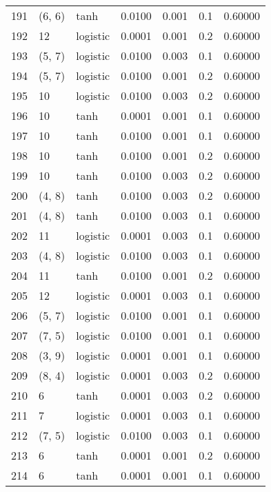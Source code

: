 \begin{tabular}{lllrrrr}
191 &      (6, 6) &      tanh &  0.0100 &  0.001 &  0.1 &   0.60000 \\
192 &          12 &  logistic &  0.0001 &  0.001 &  0.2 &   0.60000 \\
193 &      (5, 7) &  logistic &  0.0100 &  0.003 &  0.1 &   0.60000 \\
194 &      (5, 7) &  logistic &  0.0100 &  0.001 &  0.2 &   0.60000 \\
195 &          10 &  logistic &  0.0100 &  0.003 &  0.2 &   0.60000 \\
196 &          10 &      tanh &  0.0001 &  0.001 &  0.1 &   0.60000 \\
197 &          10 &      tanh &  0.0100 &  0.001 &  0.1 &   0.60000 \\
198 &          10 &      tanh &  0.0100 &  0.001 &  0.2 &   0.60000 \\
199 &          10 &      tanh &  0.0100 &  0.003 &  0.2 &   0.60000 \\
200 &      (4, 8) &      tanh &  0.0100 &  0.003 &  0.2 &   0.60000 \\
201 &      (4, 8) &      tanh &  0.0100 &  0.003 &  0.1 &   0.60000 \\
202 &          11 &  logistic &  0.0001 &  0.003 &  0.1 &   0.60000 \\
203 &      (4, 8) &  logistic &  0.0100 &  0.003 &  0.1 &   0.60000 \\
204 &          11 &      tanh &  0.0100 &  0.001 &  0.2 &   0.60000 \\
205 &          12 &  logistic &  0.0001 &  0.003 &  0.1 &   0.60000 \\
206 &      (5, 7) &  logistic &  0.0100 &  0.001 &  0.1 &   0.60000 \\
207 &      (7, 5) &  logistic &  0.0100 &  0.001 &  0.1 &   0.60000 \\
208 &      (3, 9) &  logistic &  0.0001 &  0.001 &  0.1 &   0.60000 \\
209 &      (8, 4) &  logistic &  0.0001 &  0.003 &  0.2 &   0.60000 \\
210 &           6 &      tanh &  0.0001 &  0.003 &  0.2 &   0.60000 \\
211 &           7 &  logistic &  0.0001 &  0.003 &  0.1 &   0.60000 \\
212 &      (7, 5) &  logistic &  0.0100 &  0.003 &  0.1 &   0.60000 \\
213 &           6 &      tanh &  0.0001 &  0.001 &  0.2 &   0.60000 \\
214 &           6 &      tanh &  0.0001 &  0.001 &  0.1 &   0.60000 \\

\end{tabular}
